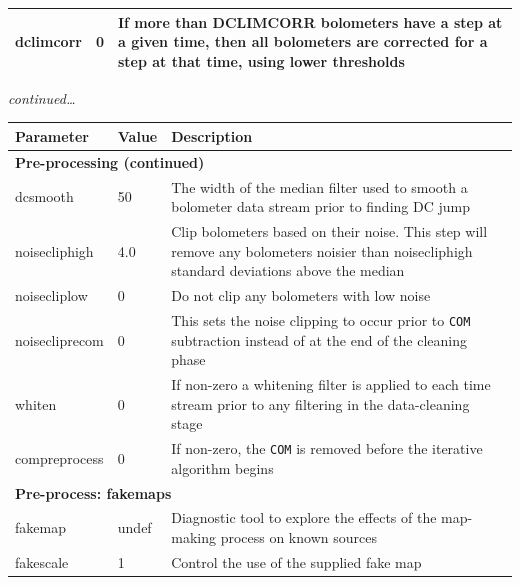 \documentclass[twoside,11pt]{article}
\newenvironment{latexonly}{}{}
\renewcommand{\_}{\texttt{\symbol{95}}}
\begin{document}
\begin{latexonly}
\begin{table}[h]
\begin{center}
\begin{small}
\begin{tabular}{|p{2.5cm}|p{1.0cm}|p{11.2cm}|}
dclimcorr     &    0 & If more than DCLIMCORR bolometers have a step at
                       a given time, then all bolometers are corrected for
                       a step at that time, using lower thresholds \\
\hline
\end{tabular}
\end{small}
\end{center}
\begin{flushright}
\textit{continued\dots}
\end{flushright}
\end{table}

\begin{table}
\begin{center}
\begin{small}
\begin{tabular}{|p{2.8cm}|p{1.1cm}|p{10.8cm}|}
\hline
Parameter & Value & Description \\
\hline
\multicolumn{3}{|l|}{\textbf{Pre-processing (continued)}}\\
\hline
dcsmooth      &   50 & The width of the median filter used to smooth a
                       bolometer data stream prior to finding DC jump \\
noisecliphigh &  4.0 & Clip bolometers based on their noise. This step
                       will remove any bolometers noisier than noisecliphigh
                       standard deviations above the median \\
noisecliplow   &   0 & Do not clip any bolometers with low noise \\
noisecliprecom &   0 & This sets the noise clipping to occur prior to
                       \texttt{COM} subtraction instead of at the end of
                       the cleaning phase \\
whiten         &   0 & If non-zero a whitening filter is applied to each
                       time stream prior to any filtering in the
                       data-cleaning stage \\
compreprocess  &   0 & If non-zero, the \texttt{COM} is removed before the
                       iterative algorithm begins \\
\hline
\multicolumn{3}{|l|}{\textbf{Pre-process: fakemaps}}\\
\hline
fakemap        & undef & Diagnostic tool to explore the effects of the
                         map-making process on known sources \\
fakescale      &     1 & Control the use of the supplied fake map \\

\end{tabular}
\end{small}
\end{center}
\end{table}
\end{latexonly}
\end{document}
